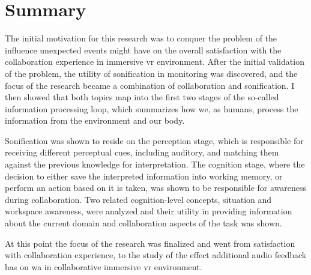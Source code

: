 
\chapter{Summary}

The initial motivation for this research was to conquer the problem of the influence unexpected events might have on the overall satisfaction with the collaboration experience in immersive \gls{vr} environment.
After the initial validation of the problem, the utility of sonification in monitoring was discovered, and the focus of the research became a combination of collaboration and sonification. I then showed that both topics map into the first two stages of the so-called information processing loop, which summarizes how we, as humans, process the information from the environment and our body.

Sonification was shown to reside on the perception stage, which is responsible for receiving different perceptual cues, including auditory, and matching them against the previous knowledge for interpretation. The cognition stage, where the decision to either save the interpreted information into working memory, or perform an action based on it is taken, was shown to be responsible for awareness during collaboration. 
Two related cognition-level concepts, situation and workspace awareness, were analyzed and their utility in providing information about the current domain and collaboration aspects of the task was shown.

At this point the focus of the research was finalized and went from satisfaction with collaboration experience, to the study of the effect additional audio feedback has on \gls{wa} in collaborative immersive \gls{vr} environment.

